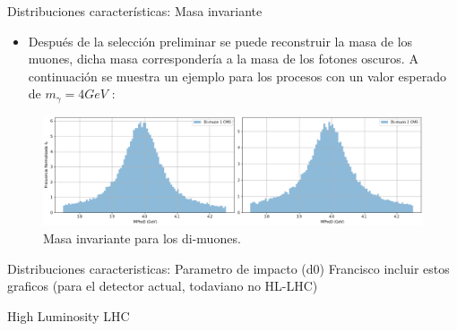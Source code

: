 \begin{frame}{Distribuciones características: Masa invariante}
    
    \begin{itemize}
        \item Después de la selección preliminar se puede reconstruir la masa de los muones, dicha masa correspondería a la masa de los fotones oscuros. A continuación se muestra un ejemplo para los procesos con un valor esperado de $m_\gamma = 4 GeV$ :%
    \end{itemize}
    
    \begin{figure}[ht]
    \centering
    \includegraphics[width=1\textwidth]{Imag/Datos_Photon4muon_CORTE_CMS.png}
    \caption{Masa invariante para los di-muones.}
    \end{figure}
\end{frame}

\begin{frame}{Distribuciones caracteristicas: Parametro de impacto (d0)}
    \color{red} Francisco incluir estos graficos (para el detector actual, todaviano no HL-LHC)
\end{frame}

\begin{frame}{}
    \begin{center}
        \LARGE High Luminosity LHC
    \end{center}
\end{frame}

